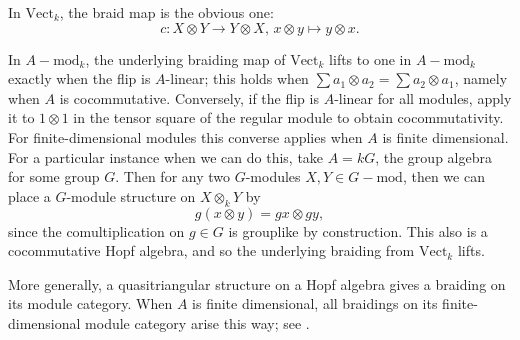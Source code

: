\begin{example}
    In $\text{Vect}_k$, the braid map is the obvious one:
    \[c:X \otimes Y \to Y \otimes X, \, x \otimes y \mapsto y \otimes x.\]
\end{example}

\begin{example}
    In $A-\text{mod}_k$, the underlying braiding map of $\text{Vect}_k$ lifts to one in $A-\text{mod}_k$ exactly when the flip is $A$-linear; this holds when $\sum a_1\otimes a_2=\sum a_2\otimes a_1$, namely when $A$ is cocommutative. Conversely, if the flip is $A$-linear for all modules, apply it to $1\otimes1$ in the tensor square of the regular module to obtain cocommutativity. For finite-dimensional modules this converse applies when $A$ is finite dimensional.
    For a particular instance when we can do this, take $A=kG$, the group algebra for some group $G$. Then for any two $G$-modules $X, Y \in G-\text{mod}$, then we can place a $G$-module structure on $X \otimes_k Y$ by
    \[g(x \otimes y) = gx \otimes gy,\]
    since the comultiplication on $g \in G$ is grouplike by construction. This also is a cocommutative Hopf algebra, and so the underlying braiding from $\text{Vect}_k$ lifts.
\end{example}

More generally, a quasitriangular structure on a Hopf algebra gives a braiding on its module category. When $A$ is finite dimensional, all braidings on its finite-dimensional module category arise this way; see \cite[Section 8.3]{EGNO}.

